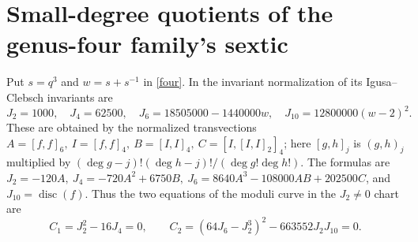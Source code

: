 \documentclass[11pt]{article}
\begin{document}
\section{Small-degree quotients of the genus-four family's sextic}
Put $s=q^3$ and $w=s+s^{-1}$ in \eqref{four}. In the invariant
normalization of \cite{Shaska} its Igusa--Clebsch invariants are
\[
 J_2=1000,\quad J_4=62500,\quad
 J_6=18505000-1440000w,\quad J_{10}=12800000(w-2)^2 .
\]
These are obtained by the normalized transvections
$A=[f,f]_6,\ I=[f,f]_4,\ B=[I,I]_4,\ C=[I,[I,I]_2]_4$; here
$[g,h]_j$ is $(g,h)_j$ multiplied by
$(\deg g-j)!(\deg h-j)!/(\deg g!\deg h!)$. The formulas are
$J_2=-120A,\ J_4=-720A^2+6750B,\
J_6=8640A^3-108000AB+202500C$, and $J_{10}=\operatorname{disc}(f)$.
Thus the two equations of the moduli curve in the $J_2\ne0$ chart are
\[
 C_1=J_2^2-16J_4=0,\qquad C_2=(64J_6-J_2^3)^2-663552J_2J_{10}=0.
\]
\end{document}
